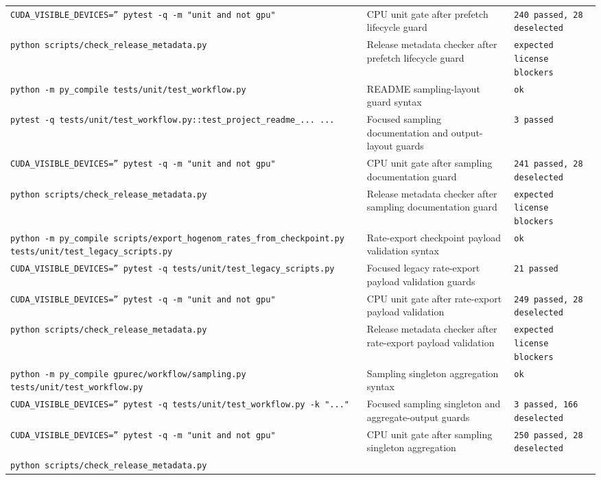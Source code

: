 \documentclass[11pt]{article}
\begin{document}
\begin{center}
\begin{tabular}{lll}
\texttt{CUDA\_VISIBLE\_DEVICES='' pytest -q -m "unit and not gpu"} &
CPU unit gate after prefetch lifecycle guard &
\texttt{240 passed, 28 deselected} \\
\texttt{python scripts/check\_release\_metadata.py} &
Release metadata checker after prefetch lifecycle guard &
\texttt{expected license blockers} \\
\texttt{python -m py\_compile tests/unit/test\_workflow.py} &
README sampling-layout guard syntax &
\texttt{ok} \\
\texttt{pytest -q tests/unit/test\_workflow.py::test\_project\_readme\_... ...} &
Focused sampling documentation and output-layout guards &
\texttt{3 passed} \\
\texttt{CUDA\_VISIBLE\_DEVICES='' pytest -q -m "unit and not gpu"} &
CPU unit gate after sampling documentation guard &
\texttt{241 passed, 28 deselected} \\
\texttt{python scripts/check\_release\_metadata.py} &
Release metadata checker after sampling documentation guard &
\texttt{expected license blockers} \\
\texttt{python -m py\_compile scripts/export\_hogenom\_rates\_from\_checkpoint.py tests/unit/test\_legacy\_scripts.py} &
Rate-export checkpoint payload validation syntax &
\texttt{ok} \\
\texttt{CUDA\_VISIBLE\_DEVICES='' pytest -q tests/unit/test\_legacy\_scripts.py} &
Focused legacy rate-export payload validation guards &
\texttt{21 passed} \\
\texttt{CUDA\_VISIBLE\_DEVICES='' pytest -q -m "unit and not gpu"} &
CPU unit gate after rate-export payload validation &
\texttt{249 passed, 28 deselected} \\
\texttt{python scripts/check\_release\_metadata.py} &
Release metadata checker after rate-export payload validation &
\texttt{expected license blockers} \\
\texttt{python -m py\_compile gpurec/workflow/sampling.py tests/unit/test\_workflow.py} &
Sampling singleton aggregation syntax &
\texttt{ok} \\
\texttt{CUDA\_VISIBLE\_DEVICES='' pytest -q tests/unit/test\_workflow.py -k "..."} &
Focused sampling singleton and aggregate-output guards &
\texttt{3 passed, 166 deselected} \\
\texttt{CUDA\_VISIBLE\_DEVICES='' pytest -q -m "unit and not gpu"} &
CPU unit gate after sampling singleton aggregation &
\texttt{250 passed, 28 deselected} \\
\texttt{python scripts/check\_release\_metadata.py} &

\end{tabular}
\end{center}
\end{document}
